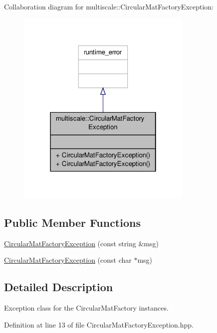 Collaboration diagram for multiscale\-:\-:Circular\-Mat\-Factory\-Exception\-:\nopagebreak
\begin{figure}[H]
\begin{center}
\leavevmode
\includegraphics[width=238pt]{classmultiscale_1_1CircularMatFactoryException__coll__graph}
\end{center}
\end{figure}
\subsection*{Public Member Functions}
\begin{DoxyCompactItemize}
\item 
\hyperlink{classmultiscale_1_1CircularMatFactoryException_a3f8244345acd3bdb7f9d08ecc701bfc7}{Circular\-Mat\-Factory\-Exception} (const string \&msg)
\item 
\hyperlink{classmultiscale_1_1CircularMatFactoryException_a4888a71048c0dd54ed6d6bb430152c6b}{Circular\-Mat\-Factory\-Exception} (const char $\ast$msg)
\end{DoxyCompactItemize}


\subsection{Detailed Description}
Exception class for the Circular\-Mat\-Factory instances. 

Definition at line 13 of file Circular\-Mat\-Factory\-Exception.\-hpp.



